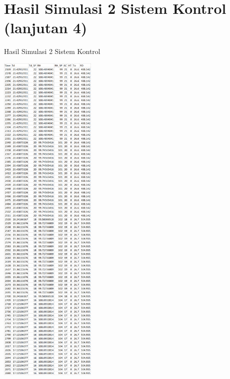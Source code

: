 \section{Hasil Simulasi 2 Sistem Kontrol (lanjutan 4)}
\begin{table}[!h]
	\caption{Hasil Simulasi 2 Sistem Kontrol}
	\label{tbl:A:HasilSimulasiKontrol24}
	\centering
	\includegraphics[width=0.35\textwidth]{figures/HasilSimulasiSimulink24}
\end{table}